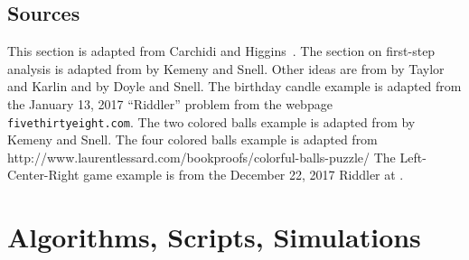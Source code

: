 \documentclass[12pt]{article}
\begin{document}
\subsection*{Sources} This section is adapted from Carchidi and
Higgins~\cite{carchidi17}.  The section on first-step analysis is
adapted from  by Kemeny and Snell.
Other ideas are from  by Taylor and Karlin and  by Doyle and Snell.  The birthday candle
example is adapted from the January 13, 2017 ``Riddler'' problem from
the webpage \texttt{fivethirtyeight.com}.  The two colored balls
example is adapted from  by Kemeny and
Snell. The four colored balls example is adapted from
http://www.laurentlessard.com/bookproofs/colorful-balls-puzzle/
The Left-Center-Right game example is from the December 22, 2017
  Riddler at
.

\nocite{kemeny60} \nocite{charchid17}
\nocite{taylor98-introd-stoch-model} \nocite{doyle84}

\hr

\section*{Algorithms, Scripts, Simulations}
\end{document}
